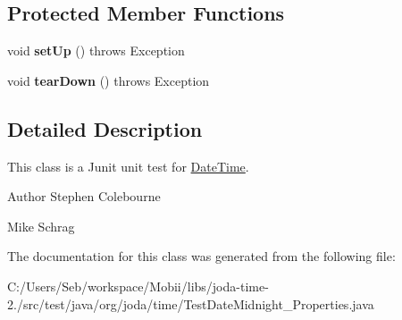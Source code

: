 \subsection*{Protected Member Functions}
\begin{DoxyCompactItemize}
\item 
\hypertarget{classorg_1_1joda_1_1time_1_1_test_date_midnight___properties_a768a7e7841c514d365c8458597250908}{void {\bfseries set\-Up} ()  throws Exception }\label{classorg_1_1joda_1_1time_1_1_test_date_midnight___properties_a768a7e7841c514d365c8458597250908}

\item 
\hypertarget{classorg_1_1joda_1_1time_1_1_test_date_midnight___properties_ae365b55ab8495731dc9a32000ec4213c}{void {\bfseries tear\-Down} ()  throws Exception }\label{classorg_1_1joda_1_1time_1_1_test_date_midnight___properties_ae365b55ab8495731dc9a32000ec4213c}

\end{DoxyCompactItemize}


\subsection{Detailed Description}
This class is a Junit unit test for \hyperlink{classorg_1_1joda_1_1time_1_1_date_time}{Date\-Time}.

\begin{DoxyAuthor}{Author}
Stephen Colebourne 

Mike Schrag 
\end{DoxyAuthor}


The documentation for this class was generated from the following file\-:\begin{DoxyCompactItemize}
\item 
C\-:/\-Users/\-Seb/workspace/\-Mobii/libs/joda-\/time-\/2./src/test/java/org/joda/time/Test\-Date\-Midnight\-\_\-\-Properties.\-java\end{DoxyCompactItemize}
